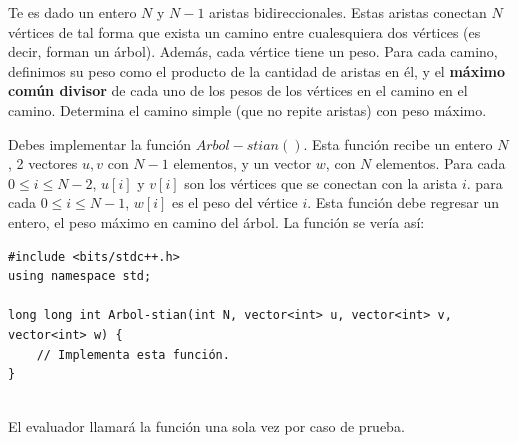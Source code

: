 \documentclass[12pt]{scrartcl}
\begin{document}
    
    
    \vspace{10pt}

    
    
        Te es dado un entero $N$ y $N - 1$ aristas bidireccionales. Estas aristas conectan $N$ vértices de tal forma que exista un camino entre cualesquiera dos vértices (es decir, forman un árbol). Además, cada vértice tiene un peso. Para cada camino, definimos su peso como el producto de la cantidad de aristas en él, y el {\bfseries máximo común divisor} de cada uno de los pesos de los vértices en el camino en el camino. Determina el camino simple (que no repite aristas) con peso máximo.
    

        Debes implementar la función $Arbol-stian()$. Esta función recibe un entero $N$, 2 vectores $u, v$ con $N - 1$ elementos, y un vector $w$, con $N$ elementos. Para cada $0 \le i \le N - 2$, $u[i]$ y $v[i]$ son los vértices que se conectan con la arista $i$. para cada $0 \le i \le N - 1$, $w[i]$ es el peso del vértice $i$. Esta función debe regresar un entero, el peso máximo en camino del árbol.
        La función se vería así:

\begin{verbatim}
#include <bits/stdc++.h>
using namespace std;

long long int Arbol-stian(int N, vector<int> u, vector<int> v, vector<int> w) {
    // Implementa esta función.
}
    
\end{verbatim}

    El evaluador llamará la función una sola vez por caso de prueba.

    
\end{document}
